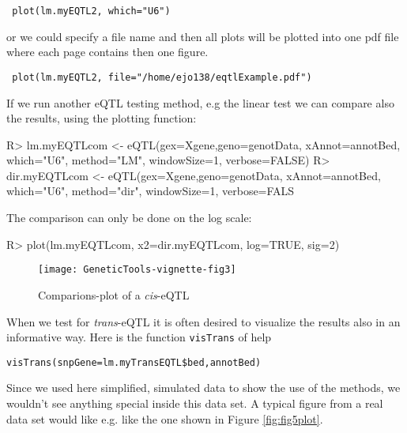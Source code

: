 \documentclass[a4paper,10pt]{article}
\begin{document}
\begin{verbatim}
 plot(lm.myEQTL2, which="U6")
\end{verbatim}

or we could specify a file name and then all plots will be plotted into one pdf file where each page contains then one figure.

\begin{verbatim}
 plot(lm.myEQTL2, file="/home/ejo138/eqtlExample.pdf")
\end{verbatim}

If we run another eQTL testing method, e.g the linear test we can compare also the results, using the plotting function:
 
\begin{Schunk}
\begin{Sinput}
R> lm.myEQTLcom <- eQTL(gex=Xgene,geno=genotData, xAnnot=annotBed, which="U6", method="LM", windowSize=1, verbose=FALSE)
R> dir.myEQTLcom <- eQTL(gex=Xgene,geno=genotData, xAnnot=annotBed, which="U6", method="dir", windowSize=1, verbose=FALS
\
\end{Sinput}
\end{Schunk}

The comparison can only be done on the log scale:

\begin{Schunk}
\begin{Sinput}
R> plot(lm.myEQTLcom, x2=dir.myEQTLcom, log=TRUE, sig=2)
\end{Sinput}
\end{Schunk}

\begin{figure}
\begin{center}
\texttt{[image: GeneticTools-vignette-fig3]}
\end{center}
\caption{Comparions-plot of a \textit{cis}-eQTL}
\label{fig:fig3plot}
\end{figure}

When we test for \textit{trans}-eQTL it is often desired to visualize the results also in an informative way. Here is the function \texttt{visTrans} of help

\begin{verbatim}
visTrans(snpGene=lm.myTransEQTL$bed,annotBed)
\end{verbatim}

Since we used here simplified, simulated data to show the use of the methods, we wouldn't see anything special inside this data set. A typical figure from a real data set 
would like e.g. like the one shown in Figure \ref{fig:fig5plot}.
\end{document}
